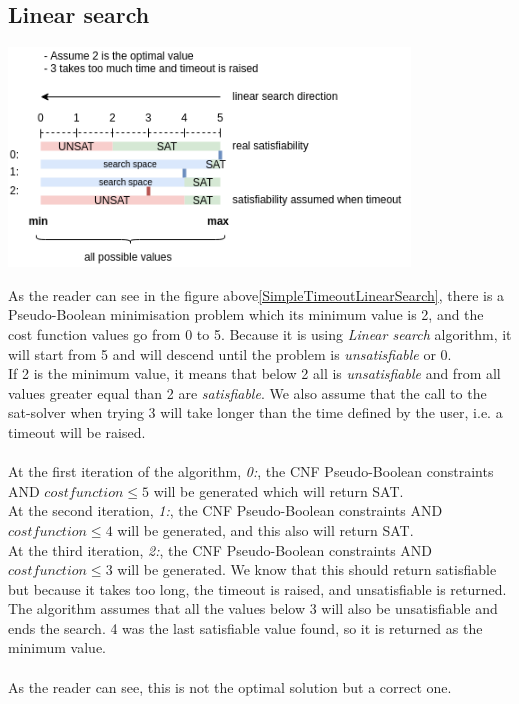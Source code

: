 \subsection{Linear search}
\begin{center}
	\includegraphics[width=0.8\textwidth]{Figures/SimpleTimeoutLinearSearch.png}
	\label{SimpleTimeoutLinearSearch}
\end{center}
As the reader can see in the figure above\ref{SimpleTimeoutLinearSearch}, there is a Pseudo-Boolean minimisation problem which its minimum value is 2, and the cost function values go from 0 to 5. Because it is using \emph{Linear search} algorithm, it will start from 5 and will descend until the problem is \emph{unsatisfiable} or 0.\\
If 2 is the minimum value, it means that below 2 all is \emph{unsatisfiable} and from all values greater equal than 2 are \emph{satisfiable}. We also assume that the call to the sat-solver when trying 3 will take longer than the time defined by the user, i.e. a timeout will be raised. \\\\
At the first iteration of the algorithm, \emph{0:}, the CNF Pseudo-Boolean constraints AND $cost function \leq 5$ will be generated which will return SAT.\\
At the second iteration, \emph{1:}, the CNF Pseudo-Boolean constraints AND $cost function \leq 4$ will be generated, and this also will return SAT.\\
At the third iteration, \emph{2:}, the CNF Pseudo-Boolean constraints AND $cost function \leq 3$ will be generated. We know that this should return satisfiable but because it takes too long, the timeout is raised, and unsatisfiable is returned. The algorithm assumes that all the values below 3 will also be unsatisfiable and ends the search. 4 was the last satisfiable value found, so it is returned as the minimum value. \\\\
As the reader can see, this is not the optimal solution but a correct one.

